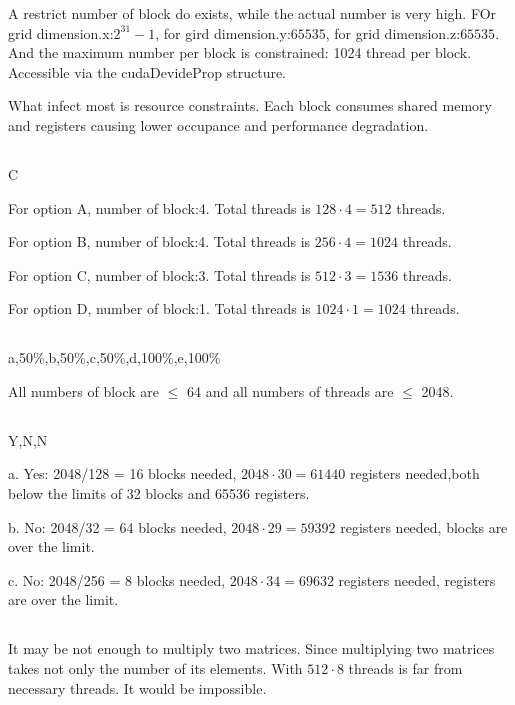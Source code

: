 \documentclass{article}
\begin{document}
A restrict number of block do exists, while the actual number is very high. FOr grid dimension.x:$2^{31}-1$, for gird dimension.y:$65535$, for grid dimension.z:$65535$. And the maximum number per block is constrained: 1024 thread per block. Accessible via the cudaDevideProp structure.

What infect most is resource constraints. Each block consumes shared memory and registers causing lower occupance and performance degradation.


\subsection{}
C

For option A, number of block:4. Total threads is \(128\cdot4=512\) threads.

For option B, number of block:4. Total threads is \(256\cdot4=1024\) threads.

For option C, number of block:3. Total threads is \(512\cdot3=1536\) threads.

For option D, number of block:1. Total threads is \(1024\cdot1=1024\) threads.

\subsection{}
a,50\%,b,50\%,c,50\%,d,100\%,e,100\%

All numbers of block are $\leq$ 64 and all numbers of threads are $\leq$ 2048.

\subsection{}

Y,N,N

a. Yes: 2048/128 = 16 blocks needed, \(2048\cdot30=61440\) registers needed,both below the limits of 32 blocks and 65536 registers.

b. No: 2048/32 = 64 blocks needed, \(2048\cdot29=59392\) registers needed, blocks are over the limit.

c. No: 2048/256 = 8 blocks needed, \(2048\cdot34=69632\) registers needed, registers are over the limit.

\subsection{}
It may be not enough to multiply two matrices. Since multiplying two matrices takes not only the number of its elements. With \(512\cdot8\) threads is far from necessary threads. It would be impossible.
\end{document}
